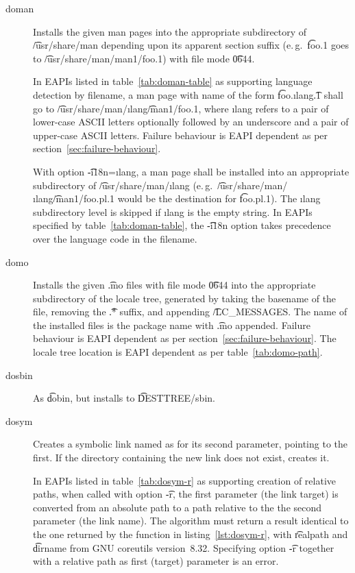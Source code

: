 \begin{description}
\item[doman] Installs the given man pages into the appropriate subdirectory of \t{/usr/share/man}
    depending upon its apparent section suffix (e.\,g.\ \t{foo.1} goes to
    \t{/usr/share/man/man1/foo.1}) with file mode \t{0644}.

     In EAPIs listed in table~\ref{tab:doman-table} as supporting
    language detection by filename, a man page with name of the form \t{foo.}\i{lang}\t{.1} shall
    go to \t{/usr/share/man/}\i{lang}\t{/man1/foo.1}, where \i{lang} refers to a pair of lower-case
    ASCII letters optionally followed by an underscore and a pair of upper-case ASCII letters.
    Failure behaviour is EAPI dependent as per section~\ref{sec:failure-behaviour}.

    With option \t{-i18n=}\i{lang}, a man page shall be installed into an appropriate subdirectory
    of \t{/usr/share/man/}\i{lang} (e.\,g.\ \t{/usr/share/man/}\i{lang}\t{/man1/foo.pl.1} would be
    the destination for \t{foo.pl.1}). The \i{lang} subdirectory level is skipped if \i{lang} is
    the empty string. In EAPIs specified by table~\ref{tab:doman-table}, the \t{-i18n} option takes
    precedence over the language code in the filename.

\item[domo]  Installs the given \t{.mo} files with file mode \t{0644} into
    the appropriate subdirectory of the locale tree, generated by taking the basename of the file,
    removing the \t{.*} suffix, and appending \t{/LC_MESSAGES}\@. The name of the installed files
    is the package name with \t{.mo} appended. Failure behaviour is EAPI dependent as per
    section~\ref{sec:failure-behaviour}. The locale tree location is EAPI dependent as per
    table~\ref{tab:domo-path}.

\item[dosbin] As \t{dobin}, but installs to \t{DESTTREE/sbin}.

\item[dosym] Creates a symbolic link named as for its second parameter, pointing to the first.
    If the directory containing the new link does not exist, creates it.

     In EAPIs listed in table~\ref{tab:dosym-r} as supporting creation
    of relative paths, when called with option \t{-r}, the first parameter (the link target) is
    converted from an absolute path to a path relative to the the second parameter (the link name).
    The algorithm must return a result identical to the one returned by the function in
    listing~\ref{lst:dosym-r}, with \t{realpath} and \t{dirname} from GNU coreutils version~8.32.
    Specifying option \t{-r} together with a relative path as first (target) parameter is an error.


\end{description}
